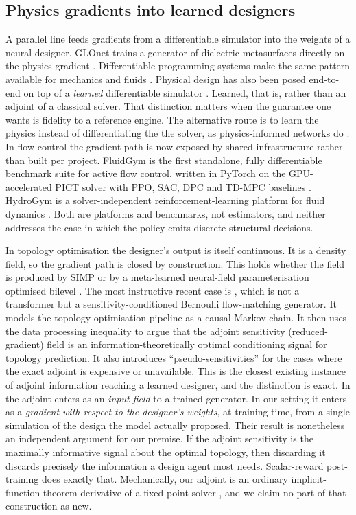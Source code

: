 \subsection{Physics gradients into learned designers}
\label{sec:rw-designers}
A parallel line feeds gradients from a differentiable simulator into the weights
of a neural designer.  GLOnet trains a generator of dielectric metasurfaces
directly on the physics gradient \cite{jiang2019glonet}.  Differentiable
programming systems make the same pattern available for mechanics and fluids
\cite{hu2020difftaichi}.  Physical design has also been posed end-to-end on top of
a \emph{learned} differentiable simulator \cite{allen2022physicaldesign}.  Learned,
that is, rather than an adjoint of a classical solver.  That distinction matters
when the guarantee one wants is fidelity to a reference engine.
The alternative route is to learn the physics instead of differentiating the
the solver, as physics-informed networks do \cite{raissi2019pinn}.  In flow control
the gradient path is now exposed by shared infrastructure rather than built per
project.  FluidGym is the first standalone, fully differentiable benchmark suite
for active flow control, written in PyTorch on the GPU-accelerated PICT solver
with PPO, SAC, DPC and TD-MPC baselines \cite{fluidgym2026}.  HydroGym is a
solver-independent reinforcement-learning platform for fluid dynamics
\cite{hydrogym2026}.  Both are platforms and benchmarks, not estimators, and
neither addresses the case in which the policy emits discrete structural
decisions.

In topology optimisation the designer's output is itself continuous.  It is a
density field, so the gradient path is closed by construction.  This holds whether
the field is produced by SIMP \cite{bendsoe1989simp} or by a meta-learned
neural-field parameterisation optimised bilevel \cite{metaneuralTO2025}.  The
most instructive recent case is \cite{topotransformer2026}, which is not a
transformer but a sensitivity-conditioned Bernoulli flow-matching generator.  It
models the topology-optimisation pipeline as a causal Markov chain.  It then uses
the data processing inequality to argue that the adjoint sensitivity
(reduced-gradient) field is an information-theoretically optimal conditioning
signal for topology prediction.  It also introduces ``pseudo-sensitivities'' for
the cases where the exact adjoint is expensive or unavailable.  This is the closest
existing instance of adjoint information reaching a learned designer, and the
distinction is exact.  In \cite{topotransformer2026} the adjoint enters as an
\emph{input field} to a trained generator.  In our setting it enters as a
\emph{gradient with respect to the designer's weights}, at training time, from a
single simulation of the design the model actually proposed.  Their result is
nonetheless an independent argument for our premise.  If the adjoint sensitivity
is the maximally informative signal about the optimal topology, then discarding it
discards precisely the information a design agent most needs.  Scalar-reward
post-training does exactly that.  Mechanically, our adjoint is an ordinary
implicit-function-theorem derivative of a fixed-point solver
\cite{giles2000adjoint,lorraine2020implicit,knoll2004jfnk}, and we claim no
part of that construction as new.

